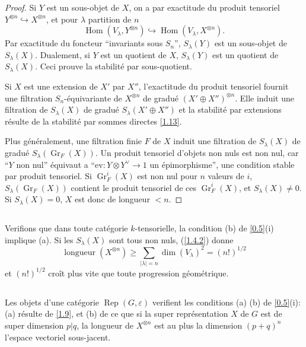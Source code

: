 \documentclass[11pt,a4paper]{article}
\theoremstyle{plain}
\theoremstyle{definition}
\DeclareMathOperator{\Hom}{Hom}
\DeclareMathOperator{\longueur}{longueur}
\DeclareMathOperator{\Gr}{Gr}
\newcommand{\ev}{\mathrm{ev}}
\newcommand{\Rep}{\operatorname{Rep}}
\begin{document}
\begin{proof}
Si $Y$ est un sous-objet de $X$, on a par exactitude du produit tensoriel $Y^{\otimes n}\hookrightarrow X^{\otimes n}$, et pour $\lambda$ partition de $n$
\[
\Hom(V_\lambda,Y^{\otimes n})\hookrightarrow\Hom(V_\lambda,X^{\otimes n}).
\]
Par exactitude du foncteur ``invariants sous $S_n$'', $S_\lambda(Y)$ est un sous-objet de $S_\lambda(X)$. Dualement, si $Y$ est un quotient de $X$, $S_\lambda(Y)$ est un quotient de $S_\lambda(X)$. Ceci prouve la stabilit\'e par sous-quotient.

Si $X$ est une extension de $X'$ par $X''$, l'exactitude du produit tensoriel fournit une filtration $S_n$-\'equivariante de $X^{\otimes n}$ de gradu\'e $(X'\oplus X'')^{\otimes n}$. Elle induit une filtration de $S_\lambda(X)$ de gradu\'e $S_\lambda(X'\oplus X'')$ et la stabilit\'e par extensions r\'esulte de la stabilit\'e par sommes directes \ref{1.13}.

Plus g\'en\'eralement, une filtration finie $F$ de $X$ induit une filtration de $S_\lambda(X)$ de gradu\'e $S_\lambda(\Gr_F(X))$. Un produit tensoriel d'objets non nuls est non nul, car ``$Y$ non nul'' \'equivaut a ``$\ev:Y\otimes Y^\vee\to1$ un \'epimorphisme'', une condition stable par produit tensoriel. Si $\Gr_F^i(X)$ est non nul pour $n$ valeurs de $i$, $S_\lambda(\Gr_F(X))$ contient le produit tensoriel de ces $\Gr_F^i(X)$, et $S_\lambda(X)\neq0$. Si $S_\lambda(X)=0$, $X$ est donc de longueur $<n$.
\end{proof}

\subsection{}\label{1.20}

Verifions que dans toute cat\'egorie $k$-tensorielle, la condition (b) de \ref{0.5}(i) implique (a). Si les $S_\lambda(X)$ sont tous non nuls, (\ref{1.4.2}) donne
\[
\longueur(X^{\otimes n})\geq\sum_{|\lambda|=n}\dim(V_\lambda)^2=(n!)^{1/2}
\]
et $(n!)^{1/2}$ cro\^it plus vite que toute progression g\'eom\'etrique.

\subsection{}\label{1.21}

Les objets d'une cat\'egorie $\Rep(G,\varepsilon)$ verifient les conditions (a) (b) de \ref{0.5}(i): (a) r\'esulte de \ref{1.9}, et (b) de ce que si la super repr\'esentation $X$ de $G$ est de super dimension $p|q$, la longueur de $X^{\otimes n}$ est au plus la dimension $(p+q)^n$ l'espace vectoriel sous-jacent.
\end{document}
